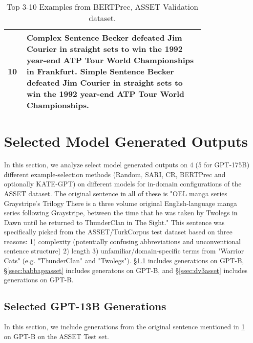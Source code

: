 \documentclass[11pt]{article}
\begin{document}
\begin{table*}[htbp]
\begin{tabular}{p{0.05\linewidth} p{0.75\linewidth}}
\midrule
10 & \textbf{Complex Sentence} Becker defeated Jim Courier in straight sets to win the 1992 year-end ATP Tour World Championships in Frankfurt. \newline \textbf{Simple Sentence} Becker defeated Jim Courier in straight sets to win the 1992 year-end ATP Tour World Championships.\\
\bottomrule
\end{tabular}
\caption{Top 3-10 Examples from BERTPrec, ASSET Validation dataset.}
\label{tab:bertprecexamples}
\end{table*}

\section{Selected Model Generated Outputs}
\label{sec:modeloutputs}

In this section, we analyze select model generated outputs on 4 (5 for GPT-175B) different example-selection methods (Random, SARI, CR, BERTPrec and optionally KATE-GPT) on different models for in-domain configurations of the ASSET dataset. The original sentence in all of these is "OEL manga series Graystripe's Trilogy There is a three volume original English-language manga series following Graystripe, between the time that he was taken by Twolegs in Dawn until he returned to ThunderClan in The Sight." This sentence was specifically picked from the ASSET/TurkCorpus test dataset based on three reasons: 1) complexity (potentially confusing abbreviations and unconventional sentence structure) 2) length 3) unfamiliar/domain-specific terms from "Warrior Cats" (e.g. "ThunderClan" and "Twolegs"). \S\ref{ssec:curieasset} includes generations on GPT-B, \S\ref{ssec:babbageasset} includes generatons on GPT-B, and \S\ref{ssec:dv3asset} includes generations on GPT-B.

\subsection{Selected GPT-13B Generations}
\label{ssec:curieasset}
In this section, we include generations from the original sentence mentioned in \ref{sec:modeloutputs} on GPT-B on the ASSET Test set.
\end{document}
